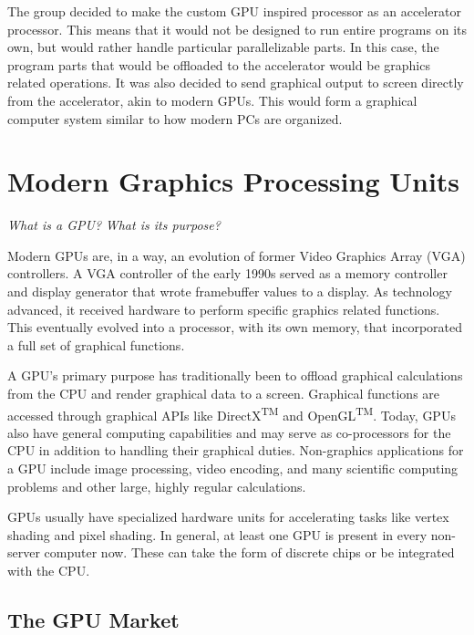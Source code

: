 \documentclass[../main/report.tex]{subfiles}
\begin{document}
The group decided to make the custom GPU inspired processor as an accelerator processor.
This means that it would not be designed to run entire programs on its own, but would rather handle particular parallelizable parts.
In this case, the program parts that would be offloaded to the accelerator would be graphics related operations.
It was also decided to send graphical output to screen directly from the accelerator, akin to modern GPUs.
This would form a graphical computer system similar to how modern PCs are organized.

\section{Modern Graphics Processing Units}

\textit{What is a GPU?}
\textit{What is its purpose?}


Modern GPUs are, in a way, an evolution of former Video Graphics Array (VGA) controllers.
A VGA controller of the early 1990s served as a memory controller and display generator that wrote framebuffer values to a display.
As technology advanced, it received hardware to perform specific graphics related functions.
This eventually evolved into a processor, with its own memory, that incorporated a full set of graphical functions.

A GPU's primary purpose has traditionally been to offload graphical calculations from the CPU and render graphical data to a screen.
Graphical functions are accessed through graphical APIs like DirectX\textsuperscript{TM} and OpenGL\textsuperscript{TM}.
Today, GPUs also have general computing capabilities and may serve as co-processors for the CPU in addition to handling their graphical duties.
Non-graphics applications for a GPU include image processing, video encoding, and many scientific computing problems and other large, highly regular calculations.

GPUs usually have specialized hardware units for accelerating tasks like vertex shading and pixel shading.
In general, at least one GPU is present in every non-server computer now.
These can take the form of discrete chips or be integrated with the CPU.

\subsection{The GPU Market}
\end{document}
